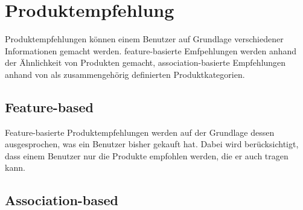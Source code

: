 \chapter{Produktempfehlung}
Produktempfehlungen können einem Benutzer auf Grundlage verschiedener Informationen gemacht werden. feature-basierte Emfpehlungen werden anhand der Ähnlichkeit von Produkten gemacht, association-basierte Empfehlungen anhand von als zusammengehörig definierten Produktkategorien.

\section{Feature-based}
Feature-basierte Produktempfehlungen werden auf der Grundlage dessen ausgesprochen, was ein Benutzer bisher gekauft hat. Dabei wird berücksichtigt, dass einem Benutzer nur die Produkte empfohlen werden, die er auch tragen kann.

\section{Association-based}
\lipsum[2]